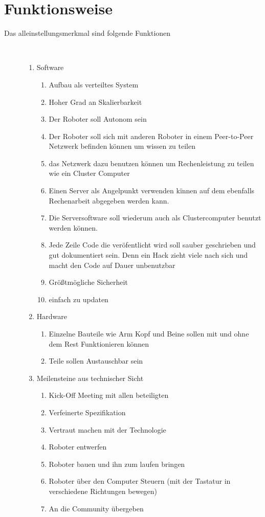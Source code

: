 \documentclass[11pt]{amsart}
\begin{document}
\section{Funktionsweise}
\begin{description}
   \item[Das alleinstellungsmerkmal sind folgende Funktionen]~\par
   \begin{enumerate}
      \item Software
      \begin{enumerate}
         \item Aufbau als verteiltes System
         \item Hoher Grad an Skalierbarkeit
         \item Der Roboter soll Autonom sein
         \item Der Roboter soll sich mit anderen Roboter in einem Peer-to-Peer Netzwerk befinden k\"onnen um wissen zu teilen
         \item das Netzwerk dazu benutzen k\"onnen um Rechenleistung  zu teilen wie ein Cluster Computer
         \item Einen Server als Angelpunkt verwenden k\"innen auf dem ebenfalls Rechenarbeit abgegeben werden kann. 
         \item Die Serversoftware soll wiederum auch als Clustercomputer benutzt werden k\"onnen.
         \item Jede Zeile Code die ver\"ofentlicht wird soll sauber geschrieben und gut dokumentiert sein. Denn ein Hack zieht viele nach sich und macht den Code auf Dauer unbenutzbar
         \item Gr\"o\ss{}tm\"ogliche Sicherheit
         \item einfach zu updaten
      \end{enumerate}
      \item Hardware
         \begin{enumerate}
         		\item Einzelne Bauteile wie Arm Kopf und Beine sollen mit und ohne dem Rest Funktionieren k\"onnen
         		\item Teile sollen Austauschbar sein
      	\end{enumerate}
      \item Meilensteine aus technischer Sicht
      	\begin{enumerate}
		\item Kick-Off Meeting mit allen beteiligten
		\item Verfeinerte Spezifikation
		\item Vertraut machen mit der Technologie
		\item Roboter entwerfen
		\item Roboter bauen und ihn zum laufen bringen
		\item Roboter \"uber den Computer Steuern (mit der Tastatur in verschiedene Richtungen bewegen)
		\item An die Community \"ubergeben
      	\end{enumerate}
   \end{enumerate}
\end{description}
\end{document}
